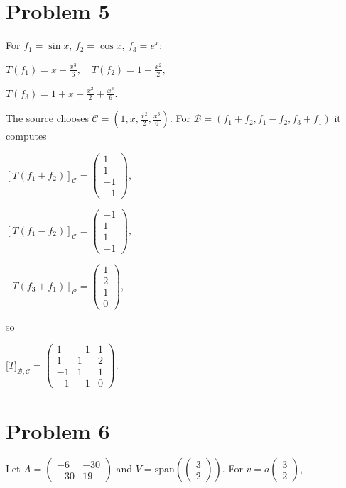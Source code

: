 \section{Problem 5}

For \(f_{1} = \sin x\), \(f_{2} = \cos x\), \(f_{3} = e^{x}\):

\(T\left( f_{1} \right) = x - \frac{x^{3}}{6},\quad T\left( f_{2} \right) = 1 - \frac{x^{2}}{2},\)

\(T\left( f_{3} \right) = 1 + x + \frac{x^{2}}{2} + \frac{x^{3}}{6}.\)

The source chooses \(\mathcal{C} = \left( {1,x,\frac{x^{2}}{2},\frac{x^{3}}{6}} \right)\). For \(\mathcal{B} = \left( {f_{1} + f_{2},f_{1} - f_{2},f_{3} + f_{1}} \right)\) it computes

\(\left\lbrack {T\left( {f_{1} + f_{2}} \right)} \right\rbrack_{\mathcal{C}} = \begin{pmatrix}
1 \\
1 \\
{- 1} \\
{- 1}
\end{pmatrix},\)

\(\left\lbrack {T\left( {f_{1} - f_{2}} \right)} \right\rbrack_{\mathcal{C}} = \begin{pmatrix}
{- 1} \\
1 \\
1 \\
{- 1}
\end{pmatrix},\)

\(\left\lbrack {T\left( {f_{3} + f_{1}} \right)} \right\rbrack_{\mathcal{C}} = \begin{pmatrix}
1 \\
2 \\
1 \\
0
\end{pmatrix},\)

so

\(\lbrack T\rbrack_{\mathcal{B},\mathcal{C}} = \begin{pmatrix}
1 & {- 1} & 1 \\
1 & 1 & 2 \\
{- 1} & 1 & 1 \\
{- 1} & {- 1} & 0
\end{pmatrix}.\)

\section{Problem 6}

Let \(A = \begin{pmatrix}
{- 6} & {- 30} \\
{- 30} & 19
\end{pmatrix}\) and \(V = \text{span}\left( \begin{pmatrix}
3 \\
2
\end{pmatrix} \right)\). For \(v = a\begin{pmatrix}
3 \\
2
\end{pmatrix}\),

